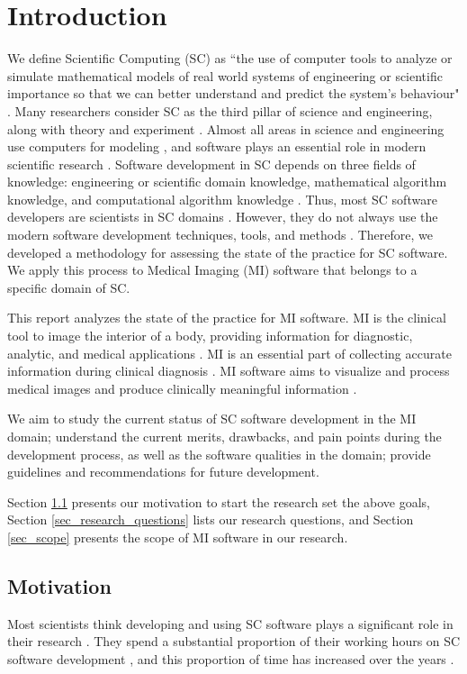 \chapter{Introduction}
\label{ch_intro}
We define Scientific Computing (SC) as ``the use of computer tools to analyze or simulate mathematical models of real world systems of engineering or scientiﬁc importance so that we can better understand and predict the system’s behaviour" \cite{Smith2006}. Many researchers consider SC as the third pillar of science and engineering, along with theory and experiment \cite{Landau2005}. Almost all areas in science and engineering use computers for modeling \cite{Golub2014}, and software plays an essential role in modern scientific research \cite{Hannay2009} \cite{Wilson2014}.  Software development in SC depends on three fields of knowledge: engineering or scientific domain knowledge, mathematical algorithm knowledge, and computational algorithm knowledge \cite{Landau2005} \cite{Mehta2015}. Thus, most SC software developers are scientists in SC domains \cite{Wilson2014}. However, they do not always use the modern software development techniques, tools, and methods \cite{Wilson2014}. Therefore, we developed a methodology for assessing the state of the practice for SC software. We apply this process to Medical Imaging (MI) software that belongs to a specific domain of SC.

This report analyzes the state of the practice for MI software. MI is the clinical tool to image the interior of a body, providing information for diagnostic, analytic, and medical applications \cite{FDA2021} \cite{enwiki:1034887445}. MI is an essential part of collecting accurate information during clinical diagnosis \cite{Zhang2008}. MI software aims to visualize and process medical images and produce clinically meaningful information \cite{enwiki:1034877594}.

We aim to study the current status of SC software development in the MI domain; understand the current merits, drawbacks, and pain points during the development process, as well as the software qualities in the domain; provide guidelines and recommendations for future development.

Section \ref{sec_motivation} presents our motivation to start the research set the above goals, Section \ref{sec_research_questions} lists our research questions, and Section \ref{sec_scope} presents the scope of MI software in our research.

\section{Motivation}
\label{sec_motivation}
Most scientists think developing and using SC software plays a significant role in their research \cite{Hannay2009}. They spend a substantial proportion of their working hours on SC software development \cite{Hannay2009} \cite{Prabhu2011}, and this proportion of time has increased over the years \cite{Hannay2009}. 

